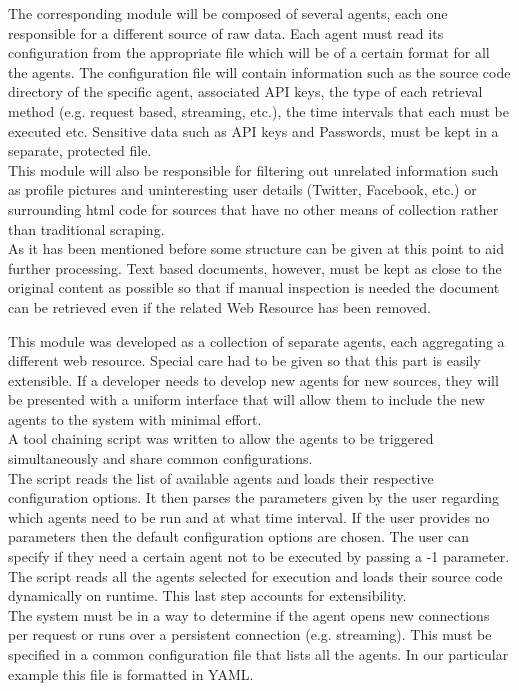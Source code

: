 \documentclass[12pt]{article}
\newcounter{subsubsubsection}[subsubsection]
\begin{document}

The corresponding module will be composed of several agents, each one responsible for a different source of raw data. Each agent must read its configuration from the appropriate file which will be of a certain format for all the agents. The configuration file will contain information such as the source code directory of the specific agent, associated API keys, the type of each retrieval method (e.g. request based, streaming, etc.), the time intervals that each must be executed etc. Sensitive data such as API keys and Passwords, must be kept in a separate, protected file.
\hfill \break \\
This module will also be responsible for filtering out unrelated information such as profile pictures and uninteresting user details (Twitter, Facebook, etc.) or surrounding html code for sources that have no other means of collection rather than traditional scraping.
\hfill \break \\
As it has been mentioned before some structure can be given at this point to aid further processing. Text based documents, however, must be kept as close to the original content as possible so that if manual inspection is needed the document can be retrieved even if the related Web Resource has been removed.



This module was developed as a collection of separate agents, each aggregating a different web resource. Special care had to be given so that this part is easily extensible. If a developer needs to develop new agents for new sources, they will be presented with a uniform interface that will allow them to include the new agents to the system with minimal effort. 
\hfill \break \\
A tool chaining script was written to allow the agents to be triggered simultaneously and share common configurations. 
\hfill \break \\
The script reads the list of available agents and loads their respective configuration options. It then parses the parameters given by the user regarding which agents need to be run and at what time interval. If the user provides no parameters then the default configuration options are chosen. The user can specify if they need a certain agent not to be executed by passing a -1 parameter. The script reads all the agents selected for execution and loads their source code dynamically on runtime. This last step accounts for extensibility. 
\hfill \break \\
The system must be in a way to determine if the agent opens new connections per request or runs over a persistent connection (e.g. streaming). This must be specified in a common configuration file that lists all the agents. In our particular example this file is formatted in YAML. 
\end{document}
